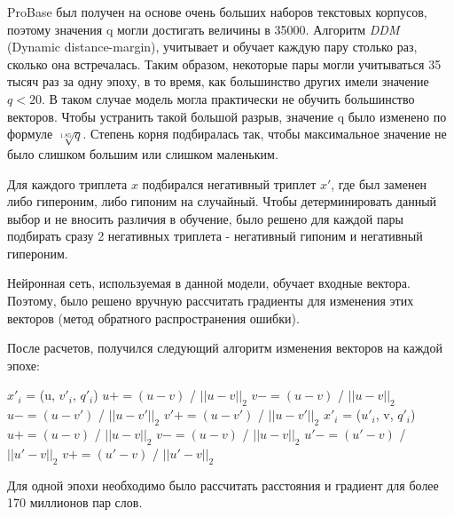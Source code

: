 ProBase был получен на основе очень больших наборов текстовых корпусов, поэтому
значения q могли достигать величины в 35000. Алгоритм \textit{DDM} (Dynamic distance-margin),
учитывает и обучает каждую пару столько раз, сколько она встречалась. Таким образом,
некоторые пары могли учитываться 35 тысяч раз за одну эпоху, в то время, как
большинство других имели значение $q < 20$. В таком случае модель могла практически не
обучить большинство векторов. Чтобы устранить такой большой разрыв, значение q было
изменено по формуле $\sqrt[1.85]{q}$. Степень корня подбиралась так, чтобы
максимальное значение не было слишком большим или слишком маленьким.

Для каждого триплета $x$ подбирался негативный триплет $x'$, где был заменен либо
гипероним, либо гипоним на случайный. Чтобы детерминировать данный выбор и
не вносить различия в обучение, было решено для каждой пары подбирать сразу 2
негативных триплета - негативный гипоним и негативный гипероним.

Нейронная сеть, используемая в данной модели, обучает входные вектора. Поэтому, было
решено вручную рассчитать градиенты для изменения этих векторов (метод обратного
распространения ошибки).

После расчетов, получился следующий алгоритм изменения векторов на каждой эпохе:


\begin{algorithmic}

        \State $x'_i$ = (u, $v'_i$, $q'_i$)
        	\State $u += (u - v)$ / $|| u - v ||_2$
            \State $v -= (u - v)$ / $|| u - v ||_2$
            \State $u -= (u - v')$ / $|| u - v' ||_2$
            \State $v' += (u - v')$ / $|| u - v' ||_2$
    	\EndIf
        \State
        \State $x'_i$ = ($u'_i$, v, $q'_i$)
        	\State $u += (u - v)$ / $|| u - v ||_2$
            \State $v -= (u - v)$ / $|| u - v ||_2$
            \State $u' -= (u' - v)$ / $|| u' - v ||_2$
            \State $v += (u' - v)$ / $|| u' - v ||_2$
    	\EndIf
    \EndFor
\EndFor
\end{algorithmic}

Для одной эпохи необходимо было рассчитать расстояния и градиент для более 170 миллионов пар слов.

